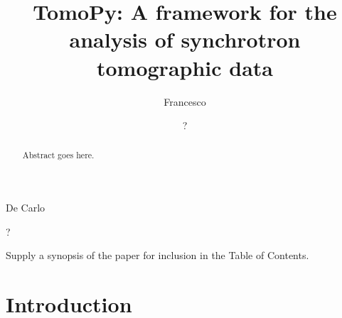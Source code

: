 \documentclass[pdf]{iucr}              %
\begin{document}



\title{TomoPy: A framework for the analysis of synchrotron tomographic data}


\author{Francesco}{De Carlo}
\author{?}{?}







\maketitle                        %

\begin{synopsis}
Supply a synopsis of the paper for inclusion in the Table of Contents.
\end{synopsis}

\begin{abstract}
Abstract goes here.
\end{abstract}


\section{Introduction}
\end{document}
